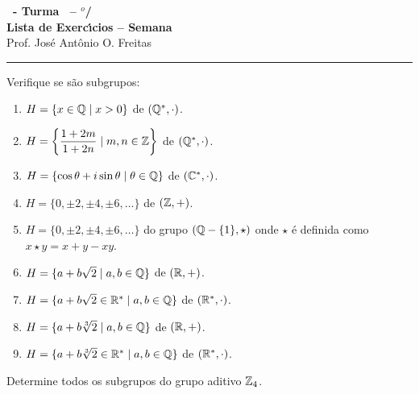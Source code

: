 \documentclass[12pt]{exam}
\begin{document}
\begin{center}

    {\Large\bf \disciplina\ - Turma \turma\ -- \semestre$^{o}$/\ano} \\ \vspace{9pt} {\large\bf
        Lista de Exerc{\'\i}cios -- Semana \numerosemana}\\ \vspace{9pt} Prof. Jos{\'e} Ant{\^o}nio O. Freitas
    \end{center}
    \hrule

    \vspace{.6cm}

    \questao{} Verifique se s\~ao subgrupos:
    \begin{enumerate}[label=({\alph*})]
      \item $H = \{x \in \mathbb{Q} \mid x > 0\}$ de $(\mathbb{Q}^*,\cdot)$.

      \item $H = \left\{\dfrac{1 + 2m}{1 + 2n} \mid m, n \in \mathbb{Z}\right\}$ de $(\mathbb{Q}^*,\cdot)$.

      \item $H = \{\cos\theta + i\sin\theta \mid \theta \in \mathbb{Q}\}$ de $(\mathbb{C}^*,\cdot)$.

      \item $H = \{0, \pm 2, \pm 4, \pm 6, \dots\}$ de $(\mathbb{Z},+)$.

      \item $H = \{0, \pm 2, \pm 4, \pm 6, \dots\}$ do grupo $(\mathbb{Q} - \{1\},\star)$ onde $\star$ \'e definida como $x \star y = x + y - xy$.

      \item $H = \{a + b\sqrt{2} \mid a, b \in \mathbb{Q}\}$ de $(\mathbb{R},+)$.

      \item $H = \{a + b\sqrt{2} \in \mathbb{R}^* \mid a, b \in \mathbb{Q}\}$ de $(\mathbb{R}^*,\cdot)$.

      \item $H = \{a + b\sqrt[3]{2} \mid a, b \in \mathbb{Q}\}$ de $(\mathbb{R},+)$.

      \item $H = \{a + b\sqrt[3]{2} \in \mathbb{R}^* \mid a, b \in \mathbb{Q}\}$ de $(\mathbb{R}^*,\cdot)$.
    \end{enumerate}

    \vspace{.3cm}

    \questao{} Determine todos os subgrupos do grupo aditivo $\mathbb{Z}_4$.

    \vspace{.3cm}
\end{document}
